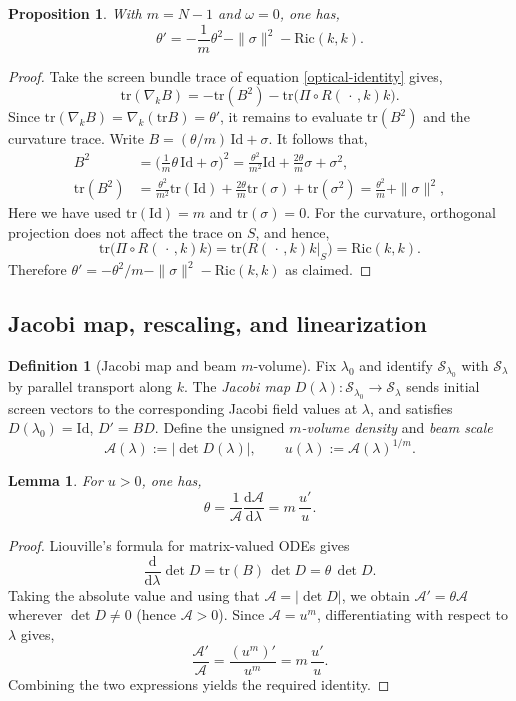 \documentclass[a4paper, reqno]{amsart}
\numberwithin{equation}{section}
\theoremstyle{plain}
\newtheorem{proposition}[theorem]{Proposition}
\newtheorem{lemma}[theorem]{Lemma}
\theoremstyle{definition}
\newtheorem{definition}[theorem]{Definition}
\theoremstyle{remark}
\newcommand{\dd}{\mathrm{d}}
\newcommand{\Id}{\mathrm{Id}}
\newcommand{\tr}{\mathrm{tr}}
\newcommand{\lam}{\lambda}
\newcommand{\lamo}{\lambda_0}
\begin{document}
\begin{proposition}\label{prop:ray}
With $m=N-1$ and $\omega=0$, one has,
\begin{equation}\label{ray}
    \theta'=-\frac{1}{m}\theta^2-\|\sigma\|^2-\mathrm{Ric}(k,k).
\end{equation}
\end{proposition}
\begin{proof}
Take the screen bundle trace of equation \ref{optical-identity} gives,
$$\tr(\nabla_k B)=-\tr(B^2)-\tr\big(\Pi\circ R(\,\cdot\,,k)k\big).$$
Since $\tr(\nabla_k B)=\nabla_k(\tr B)=\theta'$, it remains to evaluate $\tr(B^2)$ and the curvature trace. Write $B=(\theta/m)\,\Id+\sigma$. It follows that,
\begin{align*}
B^2&=\Big(\frac{1}{m}\theta\,\Id+\sigma\Big)^2
    =\frac{\theta^2}{m^2}\Id+\frac{2\theta}{m}\sigma+\sigma^2,\\
\tr(B^2)&=\frac{\theta^2}{m^2}\tr(\Id)+\frac{2\theta}{m}\tr(\sigma)+\tr(\sigma^2)
=\frac{\theta^2}{m}+\|\sigma\|^2,
\end{align*}
Here we have used $\tr(\Id)=m$ and $\tr(\sigma)=0$. For the curvature, orthogonal projection does not affect the trace on $S$, and hence,
$$\tr\big(\Pi\circ R(\,\cdot\,,k)k\big)=\tr\big(R(\,\cdot\,,k)k|_{S}\big)=\mathrm{Ric}(k,k).$$
Therefore $\theta'=-\theta^2/m-\|\sigma\|^2-\mathrm{Ric}(k,k)$ as claimed.

\end{proof}

\subsection{Jacobi map, rescaling, and linearization}\label{sec:linearization}

\begin{definition}[Jacobi map and beam $m$-volume]\label{def:Jacobi}
Fix $\lamo$ and identify $\mathcal S_{\lamo}$ with $\mathcal S_\lam$ by parallel transport along $k$. The \emph{Jacobi map} $D(\lam):\mathcal S_{\lamo}\to \mathcal S_\lam$ sends initial screen vectors to the corresponding Jacobi field values at $\lam$, and satisfies $D(\lamo)=\Id$, $D'=B D$. Define the unsigned \emph{$m$-volume density} and \emph{beam scale}
$$\mathcal A(\lam):=|\det D(\lam)|,\qquad u(\lam):=\mathcal A(\lam)^{1/m}.$$
\end{definition}

\begin{lemma}\label{lem:area}
For $u>0$, one has,
$$\theta=\frac{1}{\mathcal A}\frac{\dd\mathcal A}{\dd\lam}=m\,\frac{u'}{u}.$$
\end{lemma}
\begin{proof}
Liouville’s formula for matrix-valued ODEs gives
$$\frac{\dd}{\dd\lam}\det D=\tr(B)\,\det D=\theta\,\det D.$$
Taking the absolute value and using that $\mathcal A=|\det D|$, we obtain $\mathcal A'=\theta\mathcal A$ wherever $\det D\ne 0$ (hence $\mathcal A>0$). Since $\mathcal A=u^m$, differentiating with respect to $\lambda$ gives,
$$\frac{\mathcal A'}{\mathcal A}=\frac{(u^m)'}{u^m}=m\,\frac{u'}{u}.$$
Combining the two expressions yields the required identity.

\end{proof}
\end{document}

